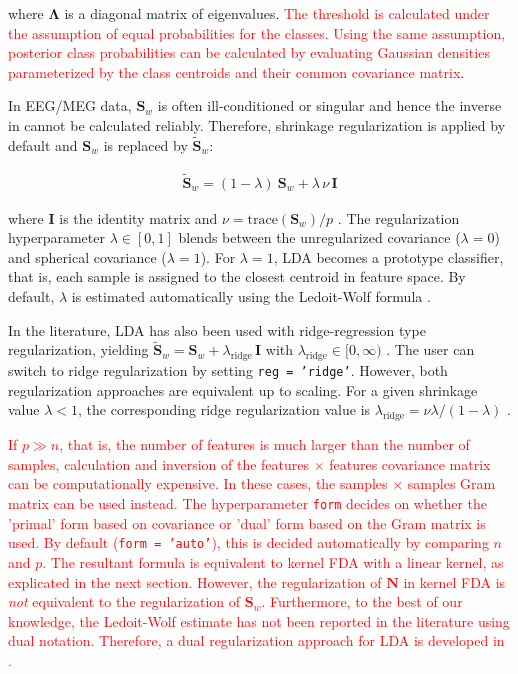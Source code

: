 \documentclass[utf8]{frontiersSCNS} %
\newcommand{\I}{\mathbf{I}}
\renewcommand{\S}{\mathbf{S}}
\newcommand{\ttt}[1]{\texttt{#1}}
\newcommand{\red}[1]{\textcolor{red}{#1}}
\begin{document}
where $\mathbf{\Lambda}$ is a diagonal matrix of eigenvalues. 
\red{The threshold is calculated under the assumption of equal probabilities for the classes. Using the same assumption, posterior class probabilities can be calculated by evaluating Gaussian densities parameterized by the class centroids and their common covariance matrix}.

In EEG/MEG data, $\S_w$ is often ill-conditioned or singular and hence the inverse in  cannot be calculated reliably. Therefore, shrinkage regularization is applied by default and $\S_w$ is replaced by $\widetilde{\S}_w$:

\begin{align}
\label{eq:shrinkage}
\widetilde{\S}_w = (1-\lambda)\ \S_w + \lambda\,\nu\,\I
\end{align}

where $\I$ is the identity matrix and $\nu = \text{trace}(\S_w)/p$ \citep{Blankertz2011}. The regularization hyperparameter $\lambda\in [0,1]$ blends between the unregularized covariance ($\lambda=0$) and spherical covariance ($\lambda=1$). For $\lambda=1$, LDA becomes a prototype classifier, that is, each sample is assigned to the closest centroid in feature space. By default, $\lambda$ is estimated automatically using the Ledoit-Wolf formula \citep{Ledoit2003HoneyMatrix,Blankertz2011}.

In the literature, LDA has also been used with ridge-regression type regularization, yielding $\widetilde{\S}_w = \S_w + \lambda_\text{ridge}\,\I$ with $\lambda_\text{ridge}\in [0,\infty)$ \citep{Friedman1989RegularizedAnalysis}. The user can switch to ridge regularization by setting \ttt{reg = 'ridge'}. However, both regularization approaches are equivalent up to scaling. For a given shrinkage value $\lambda<1$, the corresponding ridge regularization value is $\lambda_\text{ridge} = \nu\lambda / (1-\lambda)$
\citep{Treder2018Cross-validationLDA}.

\red{If $p \gg n$, that is, the number of features is much larger than the number of samples, calculation and inversion of the features $\times$ features covariance matrix can be computationally expensive. In these cases, the samples $\times$ samples Gram matrix can be used instead. The hyperparameter \ttt{form} decides on whether the 'primal' form based on covariance or 'dual' form based on the Gram matrix is used. By default (\ttt{form = 'auto'}), this is decided automatically by comparing $n$ and  $p$. The resultant formula is equivalent to kernel FDA with a linear kernel, as explicated in the next section. However, the regularization of $\mathbf{N}$ in  kernel FDA is \textit{not} equivalent to the regularization of $\S_w$. Furthermore, to the best of our knowledge, the Ledoit-Wolf estimate has not been reported in the literature using dual notation. Therefore, a dual regularization approach for LDA is developed in \prettyref{app:dualLDA}.}
\end{document}
